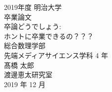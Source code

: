 \def \Year          {2019年度}
\def \University    {明治大学}
\def \Publication   {卒業論文}
\def \Title         {卒論どうでしょう}
\def \Subtitle      {ホントに卒業できるの？？？}
\def \Affiliation   {総合数理学部\\先端メディアサイエンス学科 4 年}
\def \Fullname      {髙橋 太郎}
\def \Laboratory    {渡邊恵太研究室}
\def \Date          {2019 年 12 月}

\begin{titlepage}
    \begin{center}
        \vspace{30truept}
        {\Large \Year}
        \vspace{30truept}
        {\Large \University}\\
        \vspace{30truept}
        {\Large \Publication}\\
        \vspace{80truept}
        {\Huge \Title:}\\
        \vspace{10truept}
        {\Large \Subtitle}\\
        \vspace{90truept}
        {\Large \Affiliation}\\
        \vspace{30truept}
        {\Large \Fullname}\\
        \vspace{30truept}
        {\Large \Laboratory}\\
        \vspace{30truept}
        {\Large \Date}\\
    \end{center}
\end{titlepage}
